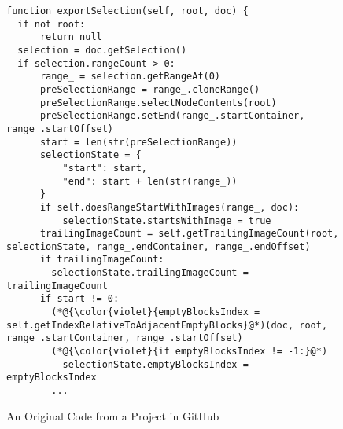 \begin{figure}[t]
	\centering
	\begin{lstlisting}[]
function exportSelection(self, root, doc) {
  if not root: 
      return null
  selection = doc.getSelection()
  if selection.rangeCount > 0:
      range_ = selection.getRangeAt(0)
      preSelectionRange = range_.cloneRange()
      preSelectionRange.selectNodeContents(root)
      preSelectionRange.setEnd(range_.startContainer, range_.startOffset)
      start = len(str(preSelectionRange))
      selectionState = {
          "start": start,
          "end": start + len(str(range_))
      }
      if self.doesRangeStartWithImages(range_, doc):
          selectionState.startsWithImage = true
      trailingImageCount = self.getTrailingImageCount(root, selectionState, range_.endContainer, range_.endOffset)
      if trailingImageCount:
        selectionState.trailingImageCount = trailingImageCount
      if start != 0:
        (*@{\color{violet}{emptyBlocksIndex = self.getIndexRelativeToAdjacentEmptyBlocks}@*)(doc, root, range_.startContainer, range_.startOffset)
        (*@{\color{violet}{if emptyBlocksIndex != -1:}@*) 
          selectionState.emptyBlocksIndex = emptyBlocksIndex
        ...
        \end{lstlisting}
\vspace{-12pt}
\caption{An Original Code from a Project in GitHub}
\label{example_org}
\end{figure}
